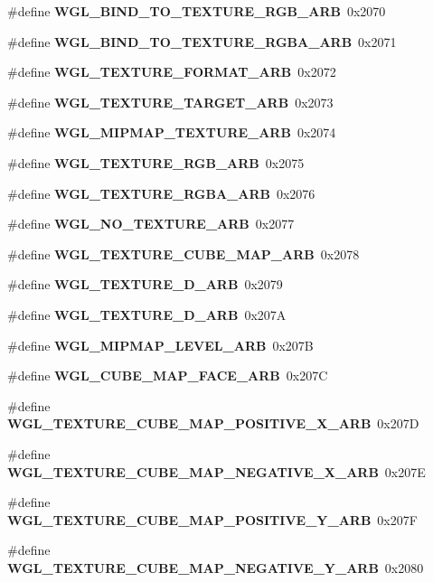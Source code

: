 \begin{DoxyCompactItemize}
\item 
\#define {\bf W\+G\+L\+\_\+\+B\+I\+N\+D\+\_\+\+T\+O\+\_\+\+T\+E\+X\+T\+U\+R\+E\+\_\+\+R\+G\+B\+\_\+\+A\+RB}~0x2070
\item 
\#define {\bf W\+G\+L\+\_\+\+B\+I\+N\+D\+\_\+\+T\+O\+\_\+\+T\+E\+X\+T\+U\+R\+E\+\_\+\+R\+G\+B\+A\+\_\+\+A\+RB}~0x2071
\item 
\#define {\bf W\+G\+L\+\_\+\+T\+E\+X\+T\+U\+R\+E\+\_\+\+F\+O\+R\+M\+A\+T\+\_\+\+A\+RB}~0x2072
\item 
\#define {\bf W\+G\+L\+\_\+\+T\+E\+X\+T\+U\+R\+E\+\_\+\+T\+A\+R\+G\+E\+T\+\_\+\+A\+RB}~0x2073
\item 
\#define {\bf W\+G\+L\+\_\+\+M\+I\+P\+M\+A\+P\+\_\+\+T\+E\+X\+T\+U\+R\+E\+\_\+\+A\+RB}~0x2074
\item 
\#define {\bf W\+G\+L\+\_\+\+T\+E\+X\+T\+U\+R\+E\+\_\+\+R\+G\+B\+\_\+\+A\+RB}~0x2075
\item 
\#define {\bf W\+G\+L\+\_\+\+T\+E\+X\+T\+U\+R\+E\+\_\+\+R\+G\+B\+A\+\_\+\+A\+RB}~0x2076
\item 
\#define {\bf W\+G\+L\+\_\+\+N\+O\+\_\+\+T\+E\+X\+T\+U\+R\+E\+\_\+\+A\+RB}~0x2077
\item 
\#define {\bf W\+G\+L\+\_\+\+T\+E\+X\+T\+U\+R\+E\+\_\+\+C\+U\+B\+E\+\_\+\+M\+A\+P\+\_\+\+A\+RB}~0x2078
\item 
\#define {\bf W\+G\+L\+\_\+\+T\+E\+X\+T\+U\+R\+E\+\_\+D\+\_\+\+A\+RB}~0x2079
\item 
\#define {\bf W\+G\+L\+\_\+\+T\+E\+X\+T\+U\+R\+E\+\_\+D\+\_\+\+A\+RB}~0x207A
\item 
\#define {\bf W\+G\+L\+\_\+\+M\+I\+P\+M\+A\+P\+\_\+\+L\+E\+V\+E\+L\+\_\+\+A\+RB}~0x207B
\item 
\#define {\bf W\+G\+L\+\_\+\+C\+U\+B\+E\+\_\+\+M\+A\+P\+\_\+\+F\+A\+C\+E\+\_\+\+A\+RB}~0x207C
\item 
\#define {\bf W\+G\+L\+\_\+\+T\+E\+X\+T\+U\+R\+E\+\_\+\+C\+U\+B\+E\+\_\+\+M\+A\+P\+\_\+\+P\+O\+S\+I\+T\+I\+V\+E\+\_\+\+X\+\_\+\+A\+RB}~0x207D
\item 
\#define {\bf W\+G\+L\+\_\+\+T\+E\+X\+T\+U\+R\+E\+\_\+\+C\+U\+B\+E\+\_\+\+M\+A\+P\+\_\+\+N\+E\+G\+A\+T\+I\+V\+E\+\_\+\+X\+\_\+\+A\+RB}~0x207E
\item 
\#define {\bf W\+G\+L\+\_\+\+T\+E\+X\+T\+U\+R\+E\+\_\+\+C\+U\+B\+E\+\_\+\+M\+A\+P\+\_\+\+P\+O\+S\+I\+T\+I\+V\+E\+\_\+\+Y\+\_\+\+A\+RB}~0x207F
\item 
\#define {\bf W\+G\+L\+\_\+\+T\+E\+X\+T\+U\+R\+E\+\_\+\+C\+U\+B\+E\+\_\+\+M\+A\+P\+\_\+\+N\+E\+G\+A\+T\+I\+V\+E\+\_\+\+Y\+\_\+\+A\+RB}~0x2080
\item 

\end{DoxyCompactItemize}
